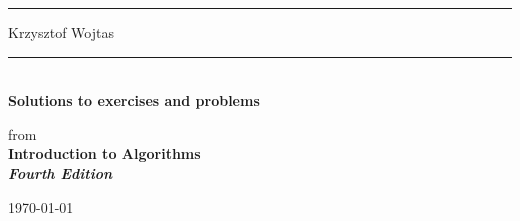\thispagestyle{empty}
\noindent\hspace*{-\lmarginparwidth}\rule{\lmarginparwidth+\textwidth}{\thickrulethickness}
\noindent\hspace*{-\lmarginparwidth}Krzysztof Wojtas
\vspace*{24ex}
\par\noindent\rule{\textwidth}{\thinrulethickness}\\[5pt]
{\Large\textbf{Solutions to exercises and problems}}
\vspace*{7ex}
\begin{center}
    from\\[1ex]
    \Large\textbf{Introduction to Algorithms\\
    \textit{Fourth Edition}}
\end{center}
\vspace*{7ex}
\par{}

\vfill

\hfill{\footnotesize\today}
